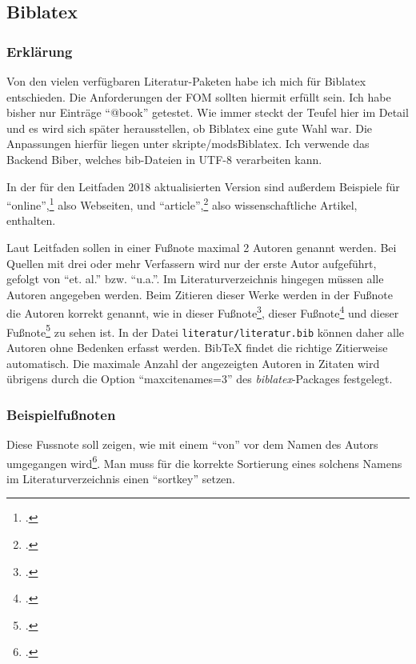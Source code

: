 
\subsection{Biblatex}
\subsubsection{Erklärung}
Von den vielen verfügbaren Literatur-Paketen habe ich mich für Biblatex entschieden. Die Anforderungen der FOM sollten hiermit erfüllt sein. Ich habe bisher nur Einträge \enquote{@book} getestet. Wie immer steckt der Teufel hier im Detail und es wird sich später herausstellen, ob Biblatex eine gute Wahl war. Die Anpassungen hierfür liegen unter skripte/modsBiblatex. Ich verwende das Backend Biber, welches bib-Dateien in UTF-8 verarbeiten kann.

In der für den Leitfaden 2018 aktualisierten Version sind außerdem Beispiele für \enquote{online},\footcite[Vgl.][]{website:angular:aboutAngular} also Webseiten, und \enquote{article},\footcite[Vgl.][S. 140]{Decker2009} also wissenschaftliche Artikel, enthalten.

Laut Leitfaden sollen in einer Fußnote maximal 2 Autoren genannt werden. Bei Quellen mit drei oder 
mehr Verfassern wird nur der erste Autor aufgeführt, gefolgt von
\enquote{et. al.} bzw. \enquote{u.a.}. Im Literaturverzeichnis hingegen müssen alle Autoren angegeben werden.
Beim Zitieren dieser Werke werden in der Fußnote die Autoren korrekt genannt, wie in 
dieser Fußnote\footcite[Vgl.][S. 1]{Balzert0.2008},
dieser Fußnote\footcite[Vgl.][S. 1]{Balzert1.2008} und
dieser Fußnote\footcite[Vgl.][S. 1]{Balzert2.2008} zu sehen ist.
In der Datei \texttt{literatur/literatur.bib} können daher alle Autoren ohne Bedenken erfasst werden.
BibTeX findet die richtige Zitierweise automatisch.
Die maximale Anzahl der angezeigten Autoren in Zitaten wird übrigens durch die Option \enquote{maxcitenames=3} des
\textit{biblatex}-Packages festgelegt.

\subsubsection{Beispielfußnoten}
Diese Fussnote soll zeigen, wie mit einem \enquote{von} vor dem Namen des Autors
umgegangen wird\footcite[Vgl.][S. 1]{Lucke2018}. Man muss für die korrekte
Sortierung eines solchens Namens im Literaturverzeichnis einen \enquote{sortkey}
setzen.

